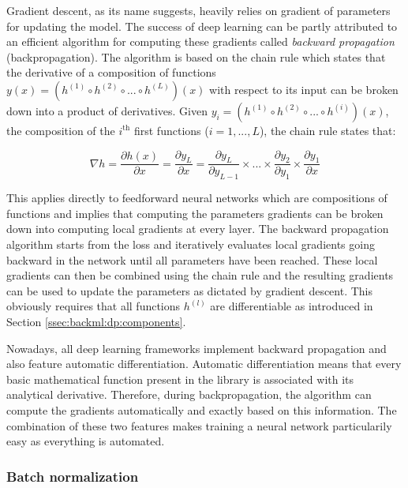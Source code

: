 Gradient descent, as its name suggests, heavily relies on gradient of parameters for updating the model. The success of deep learning can be partly attributed to an efficient algorithm for computing these gradients called \textit{backward propagation} \parencite{rumelhart1986learning} (\aka backpropagation). The algorithm is based on the chain rule which states that the derivative of a composition of functions $y(x) = (h^{(1)} \circ h^{(2)} \circ ... \circ h^{(L)})(x)$ with respect to its input can be broken down into a product of derivatives. Given $y_i = (h^{(1)} \circ h^{(2)} \circ ... \circ h^{(i)})(x)$, the composition of the $i^{\text{th}}$ first functions ($i = 1, ..., L$), the chain rule states that:

\begin{equation}
\label{eqn:backml:chainrule}
\nabla h = \dfrac{\partial h(x)}{\partial x} = \dfrac{\partial y_L}{\partial x} = \dfrac{\partial y_L}{\partial y_{L-1}} \times ... \times \dfrac{\partial y_2}{\partial y_1} \times \dfrac{\partial y_1}{\partial x}  
\end{equation}

This applies directly to feedforward neural networks which are compositions of functions and implies that computing the parameters gradients can be broken down into computing local gradients at every layer. The backward propagation algorithm starts from the loss and iteratively evaluates local gradients going backward in the network until all parameters have been reached. These local gradients can then be combined using the chain rule and the resulting gradients can be used to update the parameters as dictated by gradient descent. This obviously requires that all functions $h^{(l)}$ are differentiable as introduced in Section \ref{ssec:backml:dp:components}. 

Nowadays, all deep learning frameworks implement backward propagation and also feature automatic differentiation. Automatic differentiation means that every basic mathematical function present in the library is associated with its analytical derivative. Therefore, during backpropagation, the algorithm can compute the gradients automatically and exactly based on this information. The combination of these two features makes training a neural network particularily easy as everything is automated. 


\subsubsection{Batch normalization}
\label{sssec:backml:bacthnorm}

